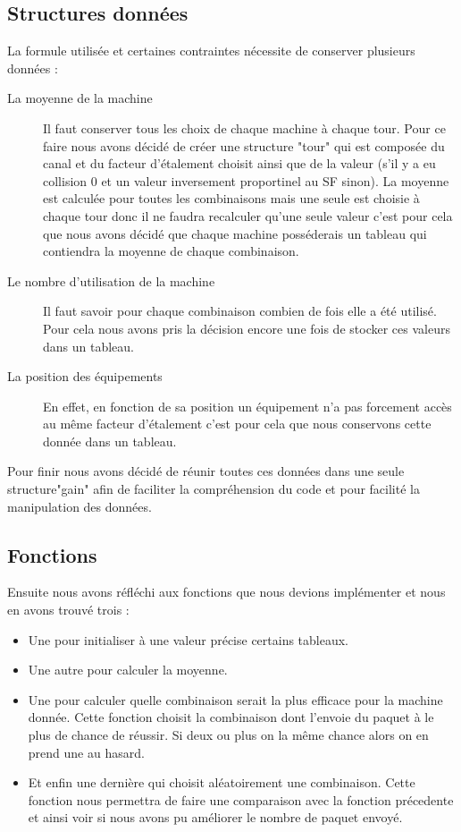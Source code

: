 \documentclass[12pt,a4paper]{article}
\begin{document}
\subsection{Structures données}
\label{sub.exp.struct}
La formule utilisée et certaines contraintes nécessite de conserver plusieurs données :
\begin{description}
    \item[La moyenne de la machine] Il faut conserver tous les 
    choix de chaque machine à chaque tour. Pour ce faire nous avons décidé
    de créer une structure "tour" qui est composée du canal et du facteur 
    d'étalement choisit ainsi que de la valeur (s'il y a eu collision 0 et 
	un valeur inversement proportinel au SF sinon).
    La moyenne est calculée pour toutes les combinaisons mais une seule est 
    choisie à chaque tour donc il ne faudra recalculer qu'une seule valeur
    c'est pour cela que nous avons décidé que chaque machine posséderais 
    un tableau qui contiendra la moyenne de chaque combinaison.
    \item[Le nombre d'utilisation de la machine] Il faut savoir pour chaque 
    combinaison combien de fois elle a été utilisé. Pour cela nous avons 
    pris la décision encore une fois de stocker ces valeurs dans un tableau.
    \item[La position des équipements] En effet, en fonction de sa position 
    un équipement n'a pas forcement accès au même facteur d'étalement c'est 
    pour cela que nous conservons cette donnée dans un tableau.
\end{description}
Pour finir nous avons décidé de réunir toutes ces données dans une seule 
structure"gain" afin de faciliter la compréhension du code et pour facilité 
la manipulation des données.

\subsection{Fonctions}
\label{sub.exp.fct}
Ensuite nous avons réfléchi aux fonctions que nous devions implémenter et 
nous en avons trouvé trois : 
\begin{itemize}
	\item Une pour initialiser à une valeur précise certains tableaux.
	\item Une autre pour calculer la moyenne.
	\item Une pour calculer quelle combinaison serait la
	plus efficace pour la machine donnée. Cette fonction choisit la combinaison
	dont l'envoie du paquet à le plus de chance de réussir. Si deux ou 
	plus on la même chance alors on en prend une au hasard.
	\item Et enfin une dernière qui choisit aléatoirement une combinaison.
	Cette fonction nous permettra de faire une comparaison avec la fonction 
	précedente et ainsi voir si nous avons pu améliorer le nombre de paquet
	envoyé.
\end{itemize}
\end{document}
